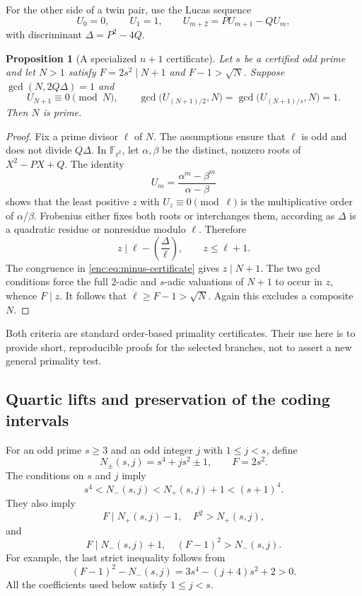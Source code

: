 \documentclass[11pt,a4paper]{article}
\newtheorem{proposition}[theorem]{Proposition}
\theoremstyle{definition}
\theoremstyle{remark}
\numberwithin{equation}{section}
\begin{document}
For the other side of a twin pair, use the Lucas sequence
\[
U_0=0,\qquad U_1=1,\qquad U_{m+2}=P U_{m+1}-Q U_m,
\]
with discriminant $\Delta=P^2-4Q$.

\begin{proposition}[A specialized $n+1$ certificate]
\label{enc:prop:minus-certificate}
Let $s$ be a certified odd prime and let $N>1$ satisfy
$F=2s^2\mid N+1$ and $F-1>\sqrt N$.
Suppose $\gcd(N,2Q\Delta)=1$ and
\begin{equation}\label{enc:eq:minus-certificate}
U_{N+1}\equiv0\pmod N,\qquad
\gcd\bigl(U_{(N+1)/2},N\bigr)
=\gcd\bigl(U_{(N+1)/s},N\bigr)=1.
\end{equation}
Then $N$ is prime.
\end{proposition}
\begin{proof}
Fix a prime divisor $\ell$ of $N$.  The assumptions ensure that $\ell$ is
odd and does not divide $Q\Delta$.  In $\mathbb F_{\ell^2}$, let
$\alpha,\beta$ be the distinct, nonzero roots of $X^2-PX+Q$.
The identity
\[
U_m=\frac{\alpha^m-\beta^m}{\alpha-\beta}
\]
shows that the least positive $z$ with $U_z\equiv0\pmod\ell$ is the
multiplicative order of $\alpha/\beta$.  Frobenius either fixes both roots
or interchanges them, according as $\Delta$ is a quadratic residue or
nonresidue modulo $\ell$.  Therefore
\[
z\mid \ell-\left(\frac{\Delta}{\ell}\right),
\qquad z\le\ell+1.
\]
The congruence in \eqref{enc:eq:minus-certificate} gives $z\mid N+1$.
The two gcd conditions force the full $2$-adic and $s$-adic valuations of
$N+1$ to occur in $z$, whence $F\mid z$.  It follows that
$\ell\ge F-1>\sqrt N$.  Again this excludes a composite $N$.
\end{proof}

Both criteria are standard order-based primality certificates.  Their
use here is to provide short, reproducible proofs for the selected
branches, not to assert a new general primality test.

\subsection{Quartic lifts and preservation of the coding intervals}

For an odd prime $s\ge3$ and an odd integer $j$ with $1\le j<s$, define
\[
N_\pm(s,j)=s^4+js^2\pm1,\qquad F=2s^2.
\]
The conditions on $s$ and $j$ imply
\begin{equation}\label{enc:eq:quartic-cell}
s^4<N_-(s,j)<N_+(s,j)+1<(s+1)^4.
\end{equation}
They also imply
\[
F\mid N_+(s,j)-1,\quad F^2>N_+(s,j),
\]
and
\[
F\mid N_-(s,j)+1,\quad (F-1)^2>N_-(s,j).
\]
For example, the last strict inequality follows from
\[
(F-1)^2-N_-(s,j)=3s^4-(j+4)s^2+2>0.
\]
All the coefficients used below satisfy $1\le j<s$.
\end{document}
